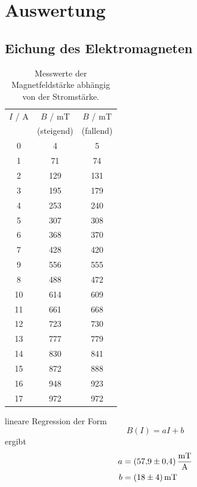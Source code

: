 \section{Auswertung}

\subsection{Eichung des Elektromagneten}
\begin{table}
  \centering
  \caption{Messwerte der Magnetfeldstärke abhängig von der Stromstärke.}
  \label{tab:B}
  \begin{tabular}{S[table-format=2] S[table-format=3] S[table-format=3]}
    \toprule
    {$I$ / A} &  {$B$ / mT} & {$B$ / mT} \\
    {} & {(steigend)} & {(fallend)} \\
     &    4 &     5 \\
    1 &   71 &   74 \\
    2 &  129 &  131 \\
    3 &  195 &  179 \\
    4 &  253 &  240 \\
    5 &  307 &  308 \\
    6 &  368 &  370 \\
    7 &  428 &  420 \\
    9 &  556 &  555 \\
    8 &  488 &  472 \\
    10 & 614 &  609 \\
    11 & 661 &  668 \\
    12 & 723 &  730 \\
    13 & 777 &  779 \\
    14 & 830 &  841 \\
    15 & 872 &  888 \\
    16 & 948 &  923 \\
    17 & 972 &  972 \\
    \bottomrule
  \end{tabular}
\end{table}

lineare Regression der Form
\begin{equation}
  B(I) = aI + b
\end{equation}
ergibt
\begin{align*}
  a &= \SI{57.9 \pm 0.4}{\frac{mT}{A}} \\
  b &= \SI{18 \pm 4}{mT}
\end{align*}


